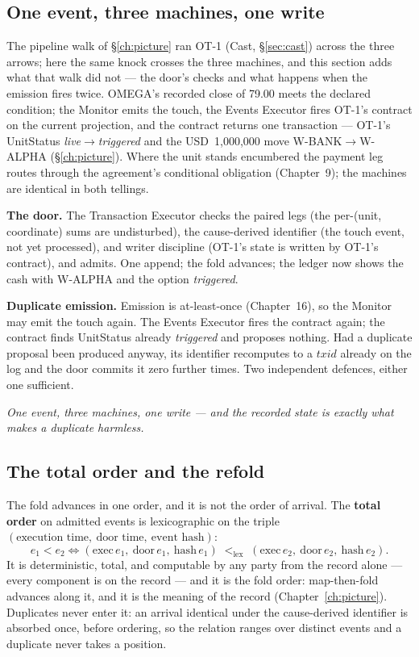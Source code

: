 \documentclass[11pt,a4paper]{article}
\newcommand{\USD}[1]{\mbox{USD~#1}}
\begin{document}
\subsection{One event, three machines, one write}

The pipeline walk of \S\ref{ch:picture} ran OT-1 (Cast, \S\ref{sec:cast}) across the three
arrows; here the same knock crosses the three machines, and this section adds what that walk did
not --- the door's checks and what happens when the emission fires twice. OMEGA's recorded close
of 79.00 meets the declared condition; the Monitor emits the touch, the Events Executor fires
OT-1's contract on the current projection, and the contract returns one transaction --- OT-1's
UnitStatus \emph{live}$\to$\emph{triggered} and the \USD{1{,}000{,}000} move
\mbox{W-BANK}$\to$\mbox{W-ALPHA} (\S\ref{ch:picture}). Where the unit stands encumbered the
payment leg routes through the agreement's conditional obligation (Chapter~9); the machines are
identical in both tellings.

\textbf{The door.} The Transaction Executor checks the paired legs (the
per-(unit, coordinate) sums are undisturbed), the cause-derived identifier (the
touch event, not yet processed), and writer discipline (OT-1's state is written
by OT-1's contract), and admits. One append; the fold advances; the ledger now
shows the cash with \mbox{W-ALPHA} and the option \emph{triggered}.

\textbf{Duplicate emission.} Emission is at-least-once (Chapter~16), so the
Monitor may emit the touch again. The Events Executor fires the contract again;
the contract finds UnitStatus already \emph{triggered} and proposes nothing.
Had a duplicate proposal been produced anyway, its identifier recomputes to a
$\mathit{txid}$ already on the log and the door commits it zero further times. Two
independent defences, either one sufficient.

\emph{One event, three machines, one write --- and the recorded state is
exactly what makes a duplicate harmless.}

\subsection{The total order and the refold}\label{sec:totalorder}

The fold advances in one order, and it is not the order of arrival. The \textbf{total order}
on admitted events is lexicographic on the triple $(\text{execution time},\ \text{door
time},\ \text{event hash})$:
\[
  e_1 < e_2 \iff (\mathrm{exec}\,e_1,\ \mathrm{door}\,e_1,\ \mathrm{hash}\,e_1)
  \;<_{\text{lex}}\; (\mathrm{exec}\,e_2,\ \mathrm{door}\,e_2,\ \mathrm{hash}\,e_2).
\]
It is deterministic, total, and computable by any party from the record alone --- every
component is on the record --- and it is the fold order: map-then-fold advances along it, and
it is the meaning of the record (Chapter~\ref{ch:picture}). Duplicates never enter it: an
arrival identical under the cause-derived identifier is absorbed once, before ordering, so the
relation ranges over distinct events and a duplicate never takes a position.
\end{document}
